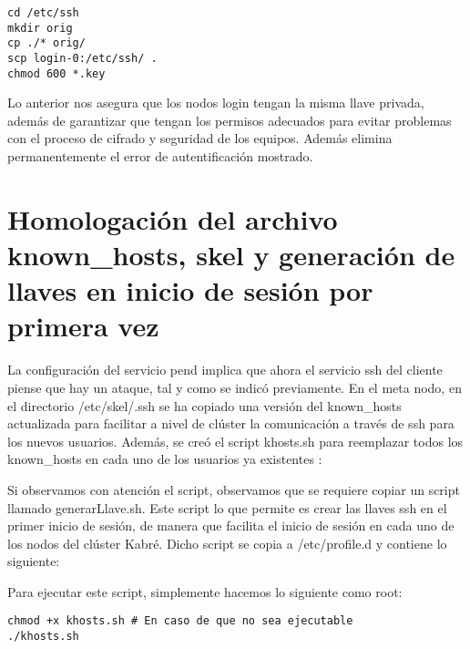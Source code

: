 \begin{lstlisting}
cd /etc/ssh
mkdir orig
cp ./* orig/
scp login-0:/etc/ssh/ .
chmod 600 *.key
\end{lstlisting}

Lo anterior nos asegura que los nodos login tengan la misma llave privada, además de garantizar que tengan los permisos adecuados para evitar problemas con el proceso de cifrado y seguridad de los equipos. Además elimina permanentemente el error de autentificación mostrado.

\section{Homologación del archivo known\_hosts, skel y generación de llaves en inicio de sesión por primera vez}
La configuración del servicio pend implica que ahora el servicio ssh del cliente 
piense que hay un ataque, tal y como se indicó previamente. En el meta nodo, en el directorio /etc/skel/.ssh se ha copiado una versión del known\_hosts actualizada para facilitar a nivel de clúster la comunicación a través de ssh para los nuevos usuarios. Además, se creó el script khosts.sh para reemplazar todos los known\_hosts en cada uno de los usuarios ya existentes \cite{loopbash}:

Si observamos con atención el script, observamos que se requiere copiar un script llamado generarLlave.sh. Este script lo que permite es crear las llaves ssh en el primer  inicio de sesión, de manera que facilita el inicio de sesión en cada uno de los nodos del clúster Kabré. Dicho script se copia a /etc/profile.d y contiene lo siguiente:


Para ejecutar este script, simplemente hacemos lo siguiente como root:
\begin{lstlisting} 
chmod +x khosts.sh # En caso de que no sea ejecutable
./khosts.sh
\end{lstlisting}
\clearpage